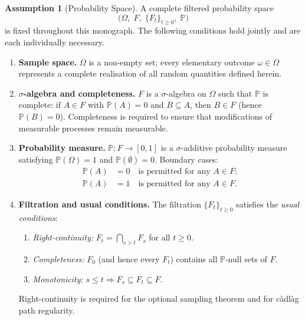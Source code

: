 \documentclass[12pt,openany]{book}
\newcommand{\Prob}{\mathbb{P}}
\newcommand{\calF}{\mathcal{F}}
\numberwithin{equation}{chapter}
\theoremstyle{plain}
\theoremstyle{definition}
\newtheorem{assumption}[theorem]{Assumption}
\theoremstyle{remark}
\def\mathcal#1{#1}%
\begin{document}
\begin{assumption}[Probability Space]
\label{asm:prob-space}
A complete filtered probability space
\begin{equation}
  \bigl(\Omega,\;\calF,\;\{\calF_t\}_{t \geq 0},\;\Prob\bigr)
  \label{eq:prob-space}
\end{equation}
is fixed throughout this monograph.  The following conditions
hold jointly and are each individually necessary.

\begin{enumerate}[label=\textbf{A1.\arabic*.}, leftmargin=*, widest=A1.4.]
  \item \textbf{Sample space.}
        $\Omega$ is a non-empty set; every elementary outcome
        $\omega \in \Omega$ represents a complete realisation of
        all random quantities defined herein.

  \item \textbf{$\sigma$-algebra and completeness.}
        $\calF$ is a $\sigma$-algebra on $\Omega$ such that
        $\Prob$ is complete: if $A \in \calF$ with
        $\Prob(A) = 0$ and $B \subseteq A$, then
        $B \in \calF$ (hence $\Prob(B) = 0$).
        Completeness is required to ensure that
        modifications of measurable processes remain
        measurable.

  \item \textbf{Probability measure.}
        $\Prob : \calF \to [0,1]$ is a $\sigma$-additive
        probability measure satisfying $\Prob(\Omega) = 1$ and
        $\Prob(\emptyset) = 0$.  Boundary cases:
        \begin{align}
          \Prob(A) &= 0 \quad \text{is permitted for any
            $A \in \calF$}; \label{eq:prob-zero} \\
          \Prob(A) &= 1 \quad \text{is permitted for any
            $A \in \calF$}. \label{eq:prob-one}
        \end{align}

  \item \textbf{Filtration and usual conditions.}
        The filtration $\{\calF_t\}_{t \geq 0}$ satisfies the
        \emph{usual conditions}:
        \begin{enumerate}[label=(\alph*)]
          \item \emph{Right-continuity:}
                $\calF_t = \bigcap_{s > t} \calF_s$ for all
                $t \geq 0$.
          \item \emph{Completeness:}
                $\calF_0$ (and hence every $\calF_t$) contains
                all $\Prob$-null sets of $\calF$.
          \item \emph{Monotonicity:}
                $s \leq t \Rightarrow \calF_s \subseteq
                \calF_t \subseteq \calF$.
        \end{enumerate}
        Right-continuity is required for the optional sampling
        theorem and for c\`{a}dl\`{a}g path regularity.


\end{enumerate}
\end{assumption}
\end{document}

